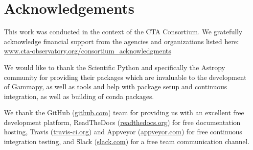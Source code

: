 \documentclass{PoS}
\newcommand{\urlCtaAck}{\href{http://www.cta-observatory.org/consortium_acknowledgments}{www.cta-observatory.org/consortium\_acknowledgments}}
\newcommand{\urlGithub}{\href{https://github.com}{github.com}}
\newcommand{\urlRtd}{\href{https://readthedocs.org}{readthedocs.org}}
\newcommand{\urlTravis}{\href{https://travis-ci.org}{travis-ci.org}}
\newcommand{\urlAppveyor}{\href{https://appveyor.com}{appveyor.com}}
\newcommand{\urlSlack}{\href{https://slack.com}{slack.com}}
\begin{document}
\section{Acknowledgements} \label{sed:acknowledgements}

This work was conducted in the context of the CTA Consortium. We gratefully
acknowledge financial support from the agencies and organizations listed here:\\
\urlCtaAck

We would like to thank the Scientific Python and specifically the Astropy
community for providing their packages which are invaluable to the development
of Gammapy, as well as tools and help with package setup and continuous
integration, as well as building of conda packages.

We thank the GitHub (\urlGithub) team for providing us with an excellent free
development platform, ReadTheDocs (\urlRtd) for free documentation hosting,
Travis (\urlTravis) and Appveyor (\urlAppveyor) for free continuous integration
testing, and Slack (\urlSlack) for a free team communication channel.



\end{document}
